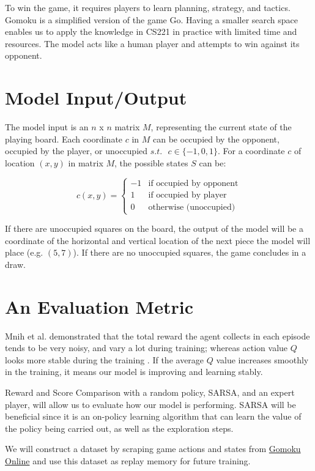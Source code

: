\documentclass[conference]{IEEEtran}
\begin{document}
 To win the game, it requires players to learn planning, strategy, and tactics. Gomoku is a simplified version of the game Go. Having a smaller search space enables us to apply the knowledge in CS221 in practice with limited time and resources. The model acts like a human player and attempts to win against its opponent.

\section{Model Input/Output}
The model input is an $n$ x $n$ matrix $M$, representing the current state of the playing board. Each coordinate $c$ in $M$ can be occupied by the opponent, occupied by the player, or unoccupied $s.t. \text{ }c \in \{-1, 0, 1 \}$. For a coordinate $c$ of location $(x, y)$ in matrix $M$, the possible states $S$ can be:

\[
    c(x, y) =
\begin{cases}
    -1 & \text{if occupied by opponent}\\
    1  &\text{if occupied by player}\\
    0  & \text{otherwise (unoccupied)}
\end{cases}
\]

If there are unoccupied squares on the board, the output of the model will be a coordinate of the horizontal and vertical location of the next piece the model will place (e.g. $(5, 7)$). If there are no unoccupied squares, the game concludes in a draw.

\section{An Evaluation Metric}
Mnih et al. demonstrated that the total reward the agent collects in each episode tends to be very noisy, and vary a lot during training; whereas action value $Q$ looks more stable during the training \cite{b1}. If the average $Q$ value increases smoothly in the training, it means our model is improving and learning stably.

Reward and Score Comparison with a random policy, SARSA, and an expert player, will allow us to evaluate how our model is performing. SARSA will be beneficial since it is an on-policy learning algorithm that can learn the value of the policy being carried out, as well as the exploration steps.

We will construct a dataset by scraping game actions and states from \href{https://gomokuonline.com}{Gomoku Online} and use this dataset as replay memory for future training.
\end{document}
